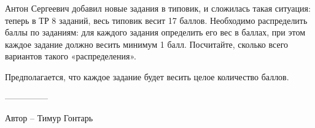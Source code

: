 \question
Антон Сергеевич добавил новые задания в типовик, и сложилась такая ситуация: теперь в ТР 8 заданий, весь типовик весит 17 баллов. Необходимо распределить баллы по заданиям: для каждого задания определить его вес в баллах, при этом каждое задание должно весить минимум 1 балл. Посчитайте, сколько всего вариантов такого «распределения».

Предполагается, что каждое задание будет весить целое количество баллов.

---------------

Автор -- Тимур Гонтарь
